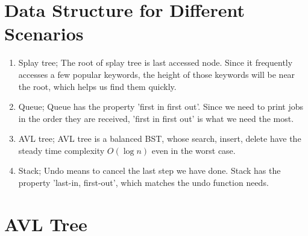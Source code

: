 \documentclass[12pt,a4paper]{article}
\begin{document}
\section{Data Structure for Different Scenarios}    

\begin{enumerate}
    \item[(a)] Splay tree; The root of splay tree is last accessed node. Since it frequently accesses a few popular keywords, the height of those keywords will be near the root, which helps us find them quickly.
    \item[(b)] Queue; Queue has the property 'first in first out'. Since we need to print jobs in the order they are received, 'first in first out' is what we need the most.
    \item[(c)] AVL tree; AVL tree is a balanced BST, whose search, insert, delete have the steady time complexity $O(\log n)$ even in the worst case. 
    \item[(d)] Stack; Undo means to cancel the last step we have done. Stack has the property 'last-in, first-out', which matches the undo function needs.
\end{enumerate}

\section{AVL Tree}
\end{document}
